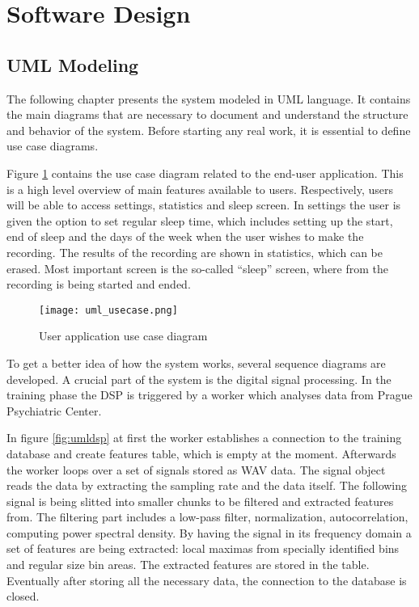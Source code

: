 \section{Software Design}\label{sec:design}

\subsection{UML Modeling}
The following chapter presents the system modeled in UML language. It contains the main diagrams that are necessary to document and understand the structure and behavior of the system. Before starting any real work, it is essential to define use case diagrams. 

Figure \ref{fig:umlusecase} contains the use case diagram related to the end-user application. This is a high level overview of main features available to users. Respectively, users will be able to access settings, statistics and sleep screen. In settings the user is given the option to set regular sleep time, which includes setting up the start, end of sleep and the days of the week when the user wishes to make the recording. The results of the recording are shown in statistics, which can be erased. Most important screen is the so-called ``sleep'' screen, where from the recording is being started and ended.

\begin{figure}[!ht]
\centering
  \texttt{[image: uml\_usecase.png]}
\caption{User application use case diagram}
\label{fig:umlusecase}
\end{figure}

To get a better idea of how the system works, several sequence diagrams are developed. A crucial part of the system is the digital signal processing. In the training phase the DSP is triggered by a worker which analyses data from Prague Psychiatric Center. 

In figure \ref{fig:umldsp} at first the worker establishes a connection to the training database and create features table, which is empty at the moment. Afterwards the worker loops over a set of signals stored as WAV data. The signal object reads the data by extracting the sampling rate and the data itself. The following signal is being slitted into smaller chunks to be filtered and extracted features from. The filtering part includes a low-pass filter, normalization, autocorrelation, computing power spectral density. By having the signal in its frequency domain a set of features are being extracted: local maximas from specially identified bins and regular size bin areas. The extracted features are stored in the table. Eventually after storing all the necessary data, the connection to the database is closed.

